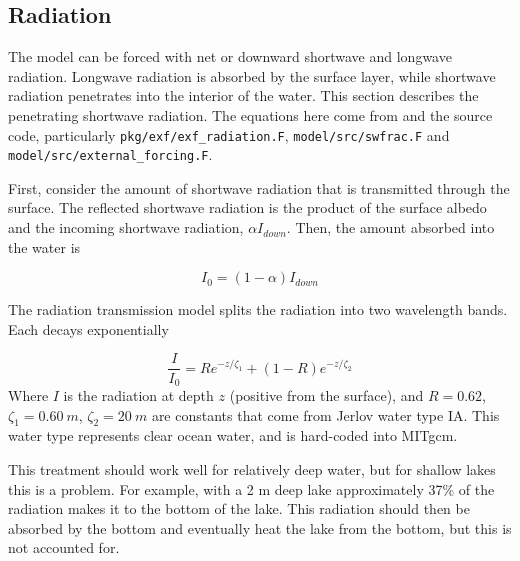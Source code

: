 \documentclass[11pt]{article}
\begin{document}
\subsection{Radiation}
The model can be forced with net or downward shortwave and longwave radiation. Longwave radiation is absorbed by the surface layer, while shortwave radiation penetrates into the interior of the water. This section describes the penetrating shortwave radiation. The equations here come from \cite{PaulsonSimpson1977} and the source code, particularly \verb|pkg/exf/exf_radiation.F|, \verb|model/src/swfrac.F| and \verb|model/src/external_forcing.F|.

First, consider the amount of shortwave radiation that is transmitted through the surface. The reflected shortwave radiation is the product of the surface albedo and the incoming shortwave radiation, $\alpha I_{down}$. Then, the amount absorbed into the water is

\begin{equation}
I_0 = (1 - \alpha) I_{down}
\end{equation}

The radiation transmission model \cite{PaulsonSimpson1977} splits the radiation into two wavelength bands. Each decays exponentially

\begin{equation}
\frac{I}{I_0} = R e^{-z/\zeta_1} + (1 - R) e^{-z/\zeta_2}
\end{equation}
Where $I$ is the radiation at depth $z$ (positive from the surface), and $R = 0.62$, $\zeta_1 = \SI{0.60}{m}$, $\zeta_2 = \SI{20}{m}$ are constants that come from Jerlov water type IA. This water type represents clear ocean water, and is hard-coded into MITgcm.

This treatment should work well for relatively deep water, but for shallow lakes this is a problem. For example, with a 2 m deep lake approximately 37\% of the radiation makes it to the bottom of the lake. This radiation should then be absorbed by the bottom and eventually heat the lake from the bottom, but this is not accounted for.
\end{document}
